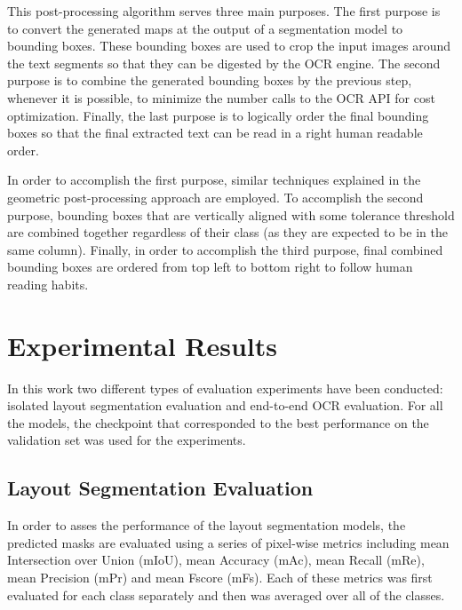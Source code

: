 \documentclass[letterpaper]{article} %
\begin{document}
This post-processing algorithm serves three main purposes. The first purpose is to convert the generated maps at the output of a segmentation model to bounding boxes. These bounding boxes are used to crop the input images around the text segments so that they can be digested by the OCR engine. The second purpose is to combine the generated bounding boxes by the previous step, whenever it is possible, to minimize the number calls to the OCR API for cost optimization. Finally, the last purpose is to logically order the final bounding boxes so that the final extracted text can be read in a right human readable order.

In order to accomplish the first purpose, similar techniques explained in the geometric post-processing approach are employed.
To accomplish the second purpose, bounding boxes that are vertically aligned with some tolerance threshold are combined together regardless of their class (as they are expected to be in the same column). Finally, in order to accomplish the third purpose, final combined bounding boxes are ordered from top left to bottom right to follow human reading habits.


\section{Experimental Results}
In this work two different types of evaluation experiments have been conducted: isolated layout segmentation evaluation and end-to-end OCR evaluation. For all the models, the checkpoint that corresponded to the best performance on the validation set was used for the experiments.
\subsection{Layout Segmentation Evaluation}

In order to asses the performance of the layout segmentation models, the predicted masks are evaluated using a series of pixel-wise metrics including mean Intersection over Union (mIoU), mean Accuracy (mAc), mean Recall (mRe), mean Precision (mPr) and mean Fscore (mFs). Each of these metrics was first evaluated for each class separately and then was averaged over all of the classes.
\end{document}
